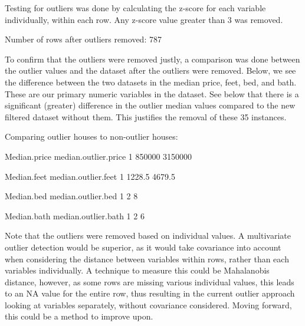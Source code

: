 \documentclass[11pt, a4paper]{article}
\begin{document}
Testing for outliers was done by calculating the z-score for each variable individually, within each row. Any z-score value greater than 3 was removed. 

\begin{Schunk}
\begin{Soutput}
Number of rows after outliers removed: 787
\end{Soutput}
\end{Schunk}

To confirm that the outliers were removed justly, a comparison was done between the outlier values and the dataset after the outliers were removed. Below, we see the difference between the two datasets in the median price, feet, bed, and bath. These are our primary numeric variables in the dataset. See below that there is a significant (greater) difference in the outlier median values compared to the new filtered dataset without them. This justifies the removal of these 35 instances.

\begin{Schunk}
\begin{Soutput}
Comparing outlier houses to non-outlier houses:
\end{Soutput}
\begin{Soutput}
  Median.price median.outlier.price
1       850000              3150000
\end{Soutput}
\begin{Soutput}
  Median.feet median.outlier.feet
1      1228.5              4679.5
\end{Soutput}
\begin{Soutput}
  Median.bed median.outlier.bed
1          2                  8
\end{Soutput}
\begin{Soutput}
  Median.bath median.outlier.bath
1           2                   6
\end{Soutput}
\end{Schunk}

Note that the outliers were removed based on individual values. A multivariate outlier detection would be superior, as it would take covariance into account when considering the distance between variables within rows, rather than each variables individually. A technique to measure this could be Mahalanobis distance, however, as some rows are missing various individual values, this leads to an NA value for the entire row, thus resulting in the current outlier approach looking at variables separately, without covariance considered. Moving forward, this could be a method to improve upon.
\par
\end{document}
